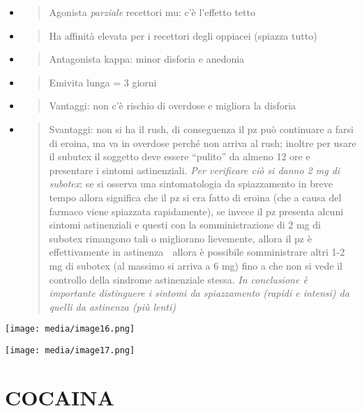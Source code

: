 \documentclass[]{article}
\begin{document}
\begin{itemize}
\item
  \begin{quote}
  Agonista \emph{parziale} recettori mu: c'è l'effetto tetto
  \end{quote}
\item
  \begin{quote}
  Ha affinità elevata per i recettori degli oppiacei (spiazza tutto)
  \end{quote}
\item
  \begin{quote}
  Antagonista kappa: minor disforia e anedonia
  \end{quote}
\item
  \begin{quote}
  Emivita lunga = 3 giorni
  \end{quote}
\item
  \begin{quote}
  Vantaggi: non c'è rischio di overdose e migliora la disforia
  \end{quote}
\item
  \begin{quote}
  Svantaggi: non si ha il rush, di conseguenza il pz può continuare a
  farsi di eroina, ma va in overdose perché non arriva al rush; inoltre
  per usare il subutex il soggetto deve essere ``pulito'' da almeno 12
  ore e presentare i sintomi astinenziali. \emph{Per verificare ciò si
  danno 2 mg di subotex}: se si osserva una sintomatologia da
  spiazzamento in breve tempo allora significa che il pz si era fatto di
  eroina (che a causa del farmaco viene spiazzata rapidamente), se
  invece il pz presenta alcuni sintomi astinenziali e questi con la
  somministrazione di 2 mg di subotex rimangono tali o migliorano
  lievemente, allora il pz è effettivamente in astinenza  allora è
  possibile somministrare altri 1-2 mg di subotex (al massimo si arriva
  a 6 mg) fino a che non si vede il controllo della sindrome
  astinenziale stessa. \emph{In conclusione è importante distinguere i
  sintomi da spiazzamento (rapidi e intensi) da quelli da astinenza (più
  lenti)}
  \end{quote}
\end{itemize}

\texttt{[image: media/image16.png]}

\texttt{[image: media/image17.png]}

\section{COCAINA}\label{cocaina}
\end{document}
